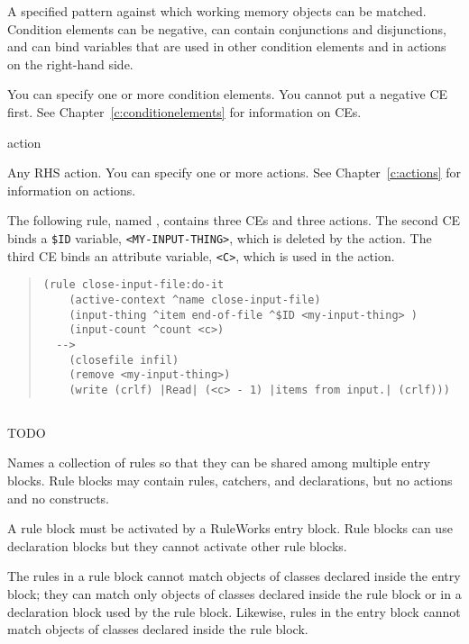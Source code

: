 {{\begin{arguments}
  A specified pattern against which working memory objects can be
  matched. Condition elements can be negative, can contain
  conjunctions and disjunctions, and can bind variables that are used
  in other condition elements and in actions on the right-hand side.

  You can specify one or more condition elements. You cannot put a
  negative CE first. See Chapter~\ref{c:conditionelements} for
  information on CEs.

\item[action]

  Any RHS action. You can specify one or more actions. See
  Chapter~\ref{c:actions} for information on actions.
\end{arguments}

\Example

The following rule, named , contains three
CEs and three actions. The second CE binds a
\verb|$ID| variable, \verb|<MY-INPUT-THING>|, which is deleted by the
 action. The third CE binds an attribute variable,
\verb|<C>|, which is used in the  action.

\begin{quote}
\begin{verbatim}
(rule close-input-file:do-it
    (active-context ^name close-input-file)
    (input-thing ^item end-of-file ^$ID <my-input-thing> )
    (input-count ^count <c>)
  -->
    (closefile infil)
    (remove <my-input-thing>)
    (write (crlf) |Read| (<c> - 1) |items from input.| (crlf)))
\end{verbatim}
\end{quote}

\subsection{}
TODO

Names a collection of rules so that they can be shared among multiple
entry blocks. Rule blocks may contain rules, catchers, and
declarations, but no  actions and no  constructs.

A rule block must be activated by a RuleWorks entry block.  Rule
blocks can use declaration blocks but they cannot activate other rule
blocks.

The rules in a rule block cannot match objects of classes declared
inside the entry block; they can match only objects of classes
declared inside the rule block or in a declaration block used by the
rule block. Likewise, rules in the entry block cannot match objects of
classes declared inside the rule block.

}}

